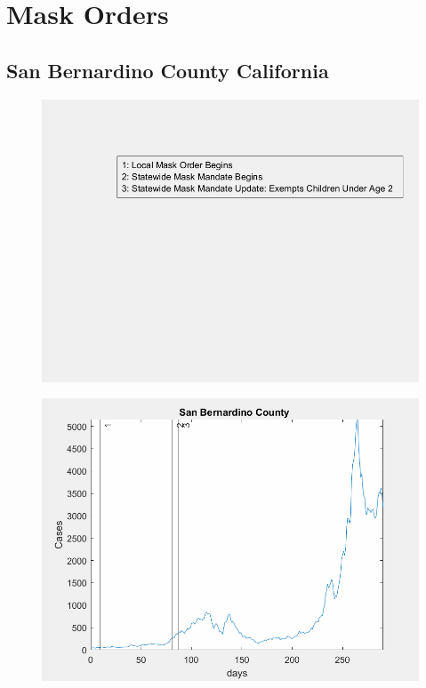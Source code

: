 \documentclass[12pt]{article}
\title{}
\author{}
\date{\today}
\begin{document}
\section{Mask Orders}
\subsection[Subtitle]{\large San Bernardino County California}

\begin{figure}[!h]
	\includegraphics[width=\linewidth]{legends/san_bernardino_mask_order_legend.png}
	\caption{}
	\label{fig:legends/san_bernardino_mask_order_legendLabel}
\end{figure}

\begin{figure}[!h]
	\includegraphics[width=\linewidth]{images/san_bernardino_mask_order.png}
	\caption{}
	\label{fig:images/san_bernardino_mask_orderLabel}
\end{figure}
\end{document}
